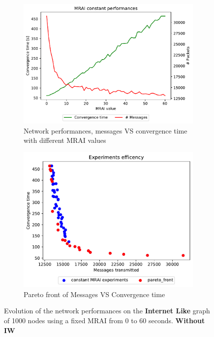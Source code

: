 \begin{figure}[h]
     \centering
     \begin{subfigure}[b]{0.45\textwidth}
         \centering
         \includegraphics[width=\textwidth]{images/internet_like/1000/constantMRAI/internet_like-constant-noIW_mrai_evolution.pdf}
		 \caption{Network performances, messages VS convergence time with different
			\ac{MRAI} values}
         \label{fig:internt_like_1000_constant_noIW_evolution_evolution}
     \end{subfigure}
     \hfill
     \begin{subfigure}[b]{0.45\textwidth}
         \centering
         \includegraphics[width=\textwidth]{images/internet_like/1000/constantMRAI/internet_like-constant-noIW.pdf}
		 \caption{Pareto front of Messages VS Convergence time}
         \label{fig:internt_like_1000_constant_noIW_evolution_paretoFront}
     \end{subfigure}
		\caption{Evolution of the network performances on the \textbf{Internet Like} graph
			of \num{1000} nodes using a fixed \ac{MRAI} from \num{0} to \num{60} seconds.
			\textbf{Without \ac{IW}}}
        \label{fig:internet_like_1000_constant_evolution_noIW}
\end{figure}

